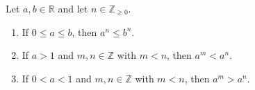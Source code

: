 \begin{lemma} \label{lemma:integer_powers_of_positive_real_numbers_are_monotonic}
    Let $a,b \in \mathbb{R}$ and let $n \in \mathbb{Z}_{\geq 0}$.
    \begin{enumerate}
        \item If $0 \leq a \leq b$, then $a^n \leq b^n$.
        \item If $a > 1$ and $m,n \in \mathbb{Z}$ with $m < n$, then $a^m < a^n$.
        \item If $0 < a < 1$ and $m,n \in \mathbb{Z}$ with $m < n$, then $a^m > a^n$.
    \end{enumerate}
\end{lemma}

